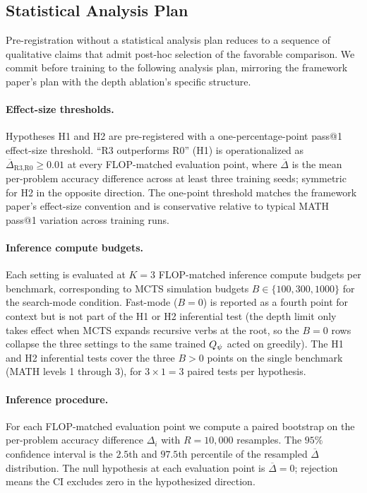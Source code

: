 \subsection{Statistical Analysis Plan}
\label{sec:exp-stats}

Pre-registration without a statistical analysis plan reduces to a
sequence of qualitative claims that admit post-hoc selection of the
favorable comparison. We commit before training to the following
analysis plan, mirroring the framework paper's plan with the depth
ablation's specific structure.

\paragraph{Effect-size thresholds.}
Hypotheses H1 and H2 are pre-registered with a one-percentage-point
pass@1 effect-size threshold. ``R3 outperforms R0'' (H1) is
operationalized as $\overline{\Delta}_{\text{R3,R0}} \geq 0.01$ at
every FLOP-matched evaluation point, where $\overline{\Delta}$ is the
mean per-problem accuracy difference across at least three training
seeds; symmetric for H2 in the opposite direction. The one-point
threshold matches the framework paper's effect-size convention and is
conservative relative to typical MATH pass@1 variation across
training runs.

\paragraph{Inference compute budgets.}
Each setting is evaluated at $K = 3$ FLOP-matched inference compute
budgets per benchmark, corresponding to MCTS simulation budgets
$B \in \{100, 300, 1000\}$ for the search-mode condition. Fast-mode
($B = 0$) is reported as a fourth point for context but is not part
of the H1 or H2 inferential test (the depth limit only takes effect
when MCTS expands recursive verbs at the root, so the $B = 0$ rows
collapse the three settings to the same trained $Q_{\psi}$ acted on
greedily). The H1 and H2 inferential tests cover the three $B > 0$
points on the single benchmark (MATH levels 1 through 3), for
$3 \times 1 = 3$ paired tests per hypothesis.

\paragraph{Inference procedure.}
For each FLOP-matched evaluation point we compute a paired bootstrap
on the per-problem accuracy difference $\Delta_i$ with $R = 10{,}000$
resamples. The $95\%$ confidence interval is the $2.5$th and $97.5$th
percentile of the resampled $\overline{\Delta}$ distribution. The
null hypothesis at each evaluation point is
$\overline{\Delta} = 0$; rejection means the CI excludes zero in the
hypothesized direction.

